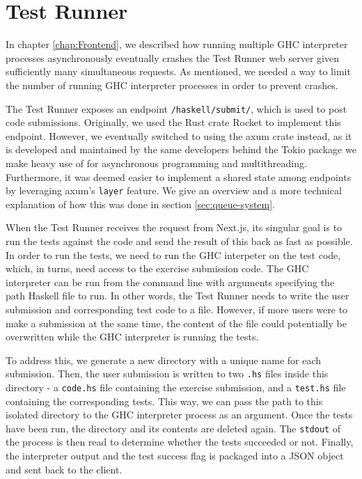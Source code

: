\chapter{Test Runner} \label{chap:TestRunner}
In chapter \ref{chap:Frontend}, we described how running multiple GHC interpreter processes asynchronously eventually crashes the Test Runner web server given sufficiently many simultaneous requests.
As mentioned, we needed a way to limit the number of running GHC interpreter processes in order to prevent crashes.

The Test Runner exposes an endpoint \texttt{/haskell/submit/}, which is used to post code submissions.
Originally, we used the Rust crate Rocket to implement this endpoint.
However, we eventually switched to using the axum crate instead, as it is developed and maintained by the same developers behind the Tokio package we make heavy use of for asynchronous programming and multithreading.
Furthermore, it was deemed easier to implement a shared state among endpoints by leveraging axum's \texttt{layer} feature.
We give an overview and a more technical explanation of how this was done in section \ref{sec:queue-system}.

When the Test Runner receives the request from Next.js, its singular goal is to run the tests against the code and send the result of this back as fast as possible.
In order to run the tests, we need to run the GHC interpeter on the test code, which, in turns, need access to the exercise submission code.
The GHC interpreter can be run from the command line with arguments specifying the path Haskell file to run.
In other words, the Test Runner needs to write the user submission and corresponding test code to a file.
However, if more users were to make a submission at the same time, the content of the file could potentially be overwritten while the GHC interpreter is running the tests.

To address this, we generate a new directory with a unique name for each submission.
Then, the user submission is written to two  \texttt{.hs} files inside this directory - a \texttt{code.hs} file containing the exercise submission, and a \texttt{test.hs} file containing the corresponding tests.
This way, we can pass the path to this isolated directory to the GHC interpreter process as an argument.
Once the tests have been run, the directory and its contents are deleted again.
The \texttt{stdout} of the process is then read to determine whether the tests succeeded or not.
Finally, the interpreter output and the test success flag is packaged into a JSON object and sent back to the client.

